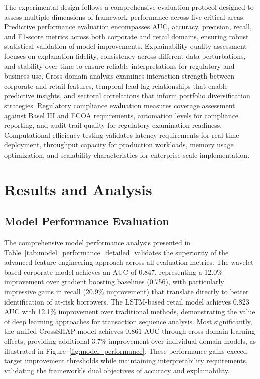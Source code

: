 \documentclass[a4 paper, 11pt,twoside]{article}
\newcommand{\0}{\Bf{0}}
\theoremstyle{definition}
\begin{document}
The experimental design follows a comprehensive evaluation protocol designed to assess multiple dimensions of framework performance across five critical areas. Predictive performance evaluation encompasses AUC, accuracy, precision, recall, and F1-score metrics across both corporate and retail domains, ensuring robust statistical validation of model improvements. Explainability quality assessment focuses on explanation fidelity, consistency across different data perturbations, and stability over time to ensure reliable interpretations for regulatory and business use. Cross-domain analysis examines interaction strength between corporate and retail features, temporal lead-lag relationships that enable predictive insights, and sectoral correlations that inform portfolio diversification strategies. Regulatory compliance evaluation measures coverage assessment against Basel III and ECOA requirements, automation levels for compliance reporting, and audit trail quality for regulatory examination readiness. Computational efficiency testing validates latency requirements for real-time deployment, throughput capacity for production workloads, memory usage optimization, and scalability characteristics for enterprise-scale implementation.
\section{Results and Analysis}

\subsection{Model Performance Evaluation}

The comprehensive model performance analysis presented in Table~\ref{tab:model_performance_detailed} validates the superiority of the advanced feature engineering approach across all evaluation metrics. The wavelet-based corporate model achieves an AUC of 0.847, representing a 12.0\% improvement over gradient boosting baselines (0.756), with particularly impressive gains in recall (20.9\% improvement) that translate directly to better identification of at-risk borrowers. The LSTM-based retail model achieves 0.823 AUC with 12.1\% improvement over traditional methods, demonstrating the value of deep learning approaches for transaction sequence analysis. Most significantly, the unified CrossSHAP model achieves 0.861 AUC through cross-domain learning effects, providing additional 3.7\% improvement over individual domain models, as illustrated in Figure~\ref{fig:model_performance}. These performance gains exceed target improvement thresholds while maintaining interpretability requirements, validating the framework's dual objectives of accuracy and explainability.
\end{document}
